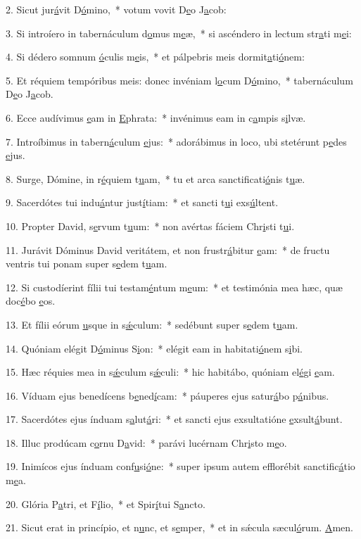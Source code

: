 2. Sicut jur\uline{á}vit D\uline{ó}mino,~* votum vovit D\uline{e}o J\uline{a}cob:\par 
3. Si introíero in tabernáculum d\uline{o}mus m\uline{e}æ,~* si ascéndero in lectum str\uline{a}ti m\uline{e}i:\par 
4. Si dédero somnum \uline{ó}culis m\uline{e}is,~* et pálpebris meis dormit\uline{a}ti\uline{ó}nem:\par 
5. Et réquiem tempóribus meis: donec invéniam l\uline{o}cum D\uline{ó}mino,~* tabernáculum D\uline{e}o J\uline{a}cob.\par 
6. Ecce audívimus \uline{e}am in \uline{E}phrata:~* invénimus eam in c\uline{a}mpis s\uline{i}lvæ.\par 
7. Introíbimus in tabern\uline{á}culum \uline{e}jus:~* adorábimus in loco, ubi stetérunt p\uline{e}des \uline{e}jus.\par 
8. Surge, Dómine, in r\uline{é}quiem t\uline{u}am,~* tu et arca sanctificati\uline{ó}nis t\uline{u}æ.\par 
9. Sacerdótes tui indu\uline{á}ntur just\uline{í}tiam:~* et sancti t\uline{u}i exs\uline{ú}ltent.\par 
10. Propter David, s\uline{e}rvum t\uline{u}um:~* non avértas fáciem Chr\uline{i}sti t\uline{u}i.\par 
11. Jurávit Dóminus David veritátem, et non frustr\uline{á}bitur \uline{e}am:~* de fructu ventris tui ponam super s\uline{e}dem t\uline{u}am.\par 
12. Si custodíerint fílii tui testam\uline{é}ntum m\uline{e}um:~* et testimónia mea hæc, quæ doc\uline{é}bo \uline{e}os.\par 
13. Et fílii eórum \uline{u}sque in s\uline{ǽ}culum:~* sedébunt super s\uline{e}dem t\uline{u}am.\par 
14. Quóniam elégit D\uline{ó}minus S\uline{i}on:~* elégit eam in habitati\uline{ó}nem s\uline{i}bi.\par 
15. Hæc réquies mea in s\uline{ǽ}culum s\uline{ǽ}culi:~* hic habitábo, quóniam el\uline{é}gi \uline{e}am.\par 
16. Víduam ejus benedícens b\uline{e}ned\uline{í}cam:~* páuperes ejus satur\uline{á}bo p\uline{á}nibus.\par 
17. Sacerdótes ejus índuam s\uline{a}lut\uline{á}ri:~* et sancti ejus exsultatióne \uline{e}xsult\uline{á}bunt.\par 
18. Illuc prodúcam c\uline{o}rnu D\uline{a}vid:~* parávi lucérnam Chr\uline{i}sto m\uline{e}o.\par 
19. Inimícos ejus índuam conf\uline{u}si\uline{ó}ne:~* super ipsum autem efflorébit sanctific\uline{á}tio m\uline{e}a.\par 
20. Glória P\uline{a}tri, et F\uline{í}lio,~* et Spir\uline{í}tui S\uline{a}ncto.\par 
21. Sicut erat in princípio, et n\uline{u}nc, et s\uline{e}mper,~* et in sǽcula sæcul\uline{ó}rum. \uline{A}men.\par 
